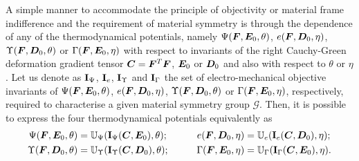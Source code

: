 A simple manner to accommodate the principle of objectivity or material frame indifference and the requirement of material symmetry is through the dependence of any of the thermodynamical potentials, namely $\Psi(\boldsymbol{F},\boldsymbol{E}_0,\theta)$, $e(\boldsymbol{F},\boldsymbol{D}_0,\eta)$, $\Upsilon(\boldsymbol{F},\boldsymbol{D}_0,\theta)$ or $\Gamma(\boldsymbol{F},\boldsymbol{E}_0,\eta)$
with respect to invariants of the right Cauchy-Green deformation gradient tensor $\boldsymbol{C}=\boldsymbol{F}^T\boldsymbol{F}$,  $\boldsymbol{E}_0$ or $\boldsymbol{D}_0$ and also with respect to $\theta$ or $\eta$. Let us denote as  ${\bf I}_{\Psi}$, ${\bf I}_{e}$, ${\bf I}_{\Upsilon}$ and ${\bf I}_{\Gamma}$ the set of electro-mechanical objective invariants of $\Psi(\boldsymbol{F},\boldsymbol{E}_0,\theta)$, $e(\boldsymbol{F},\boldsymbol{D}_0,\eta)$, $\Upsilon(\boldsymbol{F},\boldsymbol{D}_0,\theta)$ or $\Gamma(\boldsymbol{F},\boldsymbol{E}_0,\eta)$, respectively,  required to characterise a given material symmetry group $\mathcal{G}$. Then, it is possible to express the four thermodynamical potentials equivalently as
%
\begin{equation}\label{eqn:Energy_wrt_Invariants}
\begin{aligned}
\Psi(\vect{F},\vect{E}_0,\theta)&=\mathbb{U}_{\Psi}({\bf I}_{\Psi}(\vect{C},\vect{E}_0),\theta);&\qquad
%
e(\vect{F},\vect{D}_0,\eta)&=\mathbb{U}_{e}({\bf I}_{e}(\vect{C},\vect{D}_0),\eta);\\
%
\Upsilon(\vect{F},\vect{D}_0,\theta)&=\mathbb{U}_{\Upsilon}({\bf I}_{\Upsilon}(\vect{C},\vect{D}_0),\theta);&\qquad
%
\Gamma(\vect{F},\vect{E}_0,\eta)&=\mathbb{U}_{\Gamma}({\bf I}_{\Gamma}(\vect{C},\vect{E}_0),\eta).
%
\end{aligned}
\end{equation}


